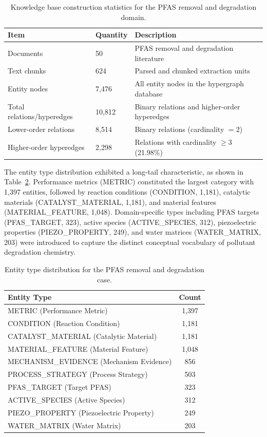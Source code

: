 \documentclass[11pt,a4paper]{article}
\begin{document}
\begin{table}[htbp]
\centering
\caption{Knowledge base construction statistics for the PFAS removal and degradation domain.}
\label{tab:pfas_kb_stats}
\begin{tabular}{@{}lll@{}}
\toprule
\textbf{Item} & \textbf{Quantity} & \textbf{Description} \\
\midrule
Documents & 50 & PFAS removal and degradation literature \\
Text chunks & 624 & Parsed and chunked extraction units \\
Entity nodes & 7,476 & All entity nodes in the hypergraph database \\
Total relations/hyperedges & 10,812 & Binary relations and higher-order hyperedges \\
Lower-order relations & 8,514 & Binary relations (cardinality $= 2$) \\
Higher-order hyperedges & 2,298 & Relations with cardinality $\geq 3$ (21.98\%) \\
\bottomrule
\end{tabular}
\end{table}

The entity type distribution exhibited a long-tail characteristic, as shown in Table~\ref{tab:pfas_entity_types}. Performance metrics (METRIC) constituted the largest category with 1,397 entities, followed by reaction conditions (CONDITION, 1,181), catalytic materials (CATALYST\_MATERIAL, 1,181), and material features (MATERIAL\_FEATURE, 1,048). Domain-specific types including PFAS targets (PFAS\_TARGET, 323), active species (ACTIVE\_SPECIES, 312), piezoelectric properties (PIEZO\_PROPERTY, 249), and water matrices (WATER\_MATRIX, 203) were introduced to capture the distinct conceptual vocabulary of pollutant degradation chemistry.

\begin{table}[htbp]
\centering
\caption{Entity type distribution for the PFAS removal and degradation case.}
\label{tab:pfas_entity_types}
\begin{tabular}{@{}lc@{}}
\toprule
\textbf{Entity Type} & \textbf{Count} \\
\midrule
METRIC (Performance Metric) & 1,397 \\
CONDITION (Reaction Condition) & 1,181 \\
CATALYST\_MATERIAL (Catalytic Material) & 1,181 \\
MATERIAL\_FEATURE (Material Feature) & 1,048 \\
MECHANISM\_EVIDENCE (Mechanism Evidence) & 856 \\
PROCESS\_STRATEGY (Process Strategy) & 503 \\
PFAS\_TARGET (Target PFAS) & 323 \\
ACTIVE\_SPECIES (Active Species) & 312 \\
PIEZO\_PROPERTY (Piezoelectric Property) & 249 \\
WATER\_MATRIX (Water Matrix) & 203 \\
\bottomrule
\end{tabular}
\end{table}
\end{document}
